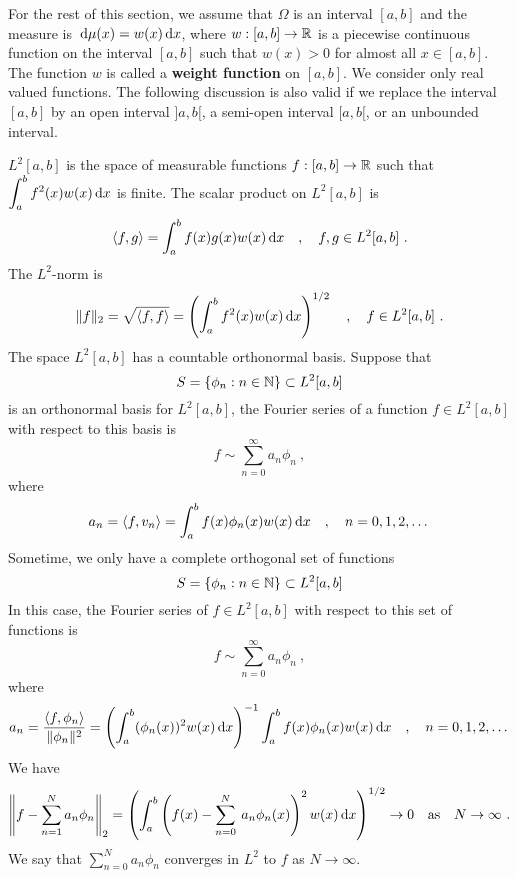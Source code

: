For the rest of this section, we assume that $\Omega$ is an interval
$[a,b]$ and the measure is $\,\mathrm{d}\mu(x) = w(x) \,\mathrm{d}x$, where
$w:[a,b]\rightarrow \mathbb{R}$ is a
piecewise continuous function on the interval $[a,b]$ such that
$w(x) > 0$ for almost all $x \in [a,b]$.  The function $w$ is called a
{\bfseries weight function} on
$[a,b]$.  We consider only real valued functions.  The following
discussion is also valid if we replace the interval $[a,b]$ by an open
interval $]a,b[$, a semi-open interval $[a,b[$, or an unbounded interval.

$L^2[a,b]$ is the space of measurable functions $f:[a,b]\rightarrow \mathbb{R}$ such
that $\displaystyle \int_a^b f^2(x) w(x) \,\mathrm{d}x$ is finite.  The scalar
product on $L^2[a,b]$ is
\begin{equation} \label{appr_scp}
\left\langle{f} , {g}\right\rangle = \int_a^b f(x) g(x) w(x) \,\mathrm{d}x \quad , \quad f, g \in L^2[a,b] \ .
\end{equation}
The $L^2$-norm is
\begin{equation} \label{appr_norm}
\| f \|_2 = \sqrt{\left\langle{f} , {f}\right\rangle} = \left(\int_a^b f^2(x) w(x) \,\mathrm{d}x\right)^{1/2}
\quad , \quad f \in L^2[a,b] \ .
\end{equation}
The space $L^2[a,b]$ has a countable orthonormal basis.  Suppose that
\[
S = \{\phi_n : n \in \mathbb{N} \} \subset L^2[a,b]
\]
is an orthonormal basis for $L^2[a,b]$, the Fourier series of a function
$f \in L^2[a,b]$ with respect to this basis is
\[
f \sim \sum_{n=0}^{\infty} a_{n} \phi_n \  ,
\]
where
\[
a_n = \left\langle{f} , {v_n}\right\rangle = \int_a^b f(x) \phi_n(x) w(x) \,\mathrm{d}x
\quad, \quad n = 0, 1, 2, \dots
\]
Sometime, we only have a complete orthogonal set of functions
\[
S = \{\phi_n : n \in \mathbb{N} \} \subset L^2[a,b]
\]
In this case, the Fourier series of $f \in L^2[a,b]$ with respect to this set
of functions is
\[
f \sim \sum_{n=0}^{\infty} a_{n} \phi_n \  ,
\]
where
\[
a_n = \frac{\left\langle{f} , {\phi_n}\right\rangle}{\| \phi_n \|^2}
= \left( \int_a^b (\phi_n(x))^2 w(x) \,\mathrm{d}x \right)^{-1}
\int_a^b f(x) \phi_n(x) w(x) \,\mathrm{d}x
\quad, \quad n = 0, 1, 2, \dots
\]
We have
\[
\left\| f - \sum_{n=1}^{N} a_n \phi_n \right\|_2
= \left( \int_a^b \left( f(x) - \sum_{n=0}^{N} \: a_n \phi_n(x) \right)^2
w(x) \,\mathrm{d}x \right)^{1/2} \rightarrow 0 \quad \text{as} \quad
N \rightarrow \infty \ .
\]
We say that $\displaystyle \sum_{n=0}^{N} a_n \phi_n$ converges in
$L^2$ to $f$ as $N\rightarrow \infty$.

